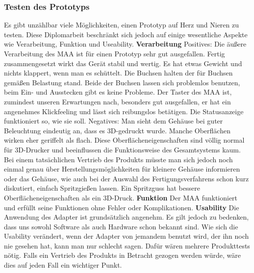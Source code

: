 \documentclass[11pt, twoside]{article}
\begin{document}
\subsubsection{Testen des Prototyps}
Es gibt unzählbar viele Möglichkeiten, einen Prototyp auf Herz und Nieren zu testen. Diese Diplomarbeit beschränkt sich jedoch auf einige wesentliche Aspekte wie Verarbeitung, Funktion und Useability.
\vspace{4mm}\newline
\textbf{Verarbeitung}
\vspace{4mm}\newline
Positives:\newline
Die äußere Verarbeitung des MAA ist für einen Prototyp sehr gut ausgefallen. Fertig zusammengesetzt wirkt das Gerät stabil und wertig. Es hat etwas Gewicht und nichts klappert, wenn man es schüttelt. Die Buchsen halten der für Buchsen gemäßen Belastung stand. Beide der Buchsen lassen sich problemlos benutzen, beim Ein- und Ausstecken gibt es keine Probleme. Der Taster des MAA ist, zumindest unseren Erwartungen nach, besonders gut ausgefallen, er hat ein angenehmes Klickfeeling und lässt sich reibungslos betätigen. Die Statusanzeige funktioniert so, wie sie soll.
\vspace{4mm}\newline
Negatives:\newline
Man sieht dem Gehäuse bei guter Beleuchtung eindeutig an, dass es 3D-gedruckt wurde. Manche Oberflächen wirken eher geriffelt als flach. Diese Oberflächeneigenschaften sind völlig normal für 3D-Drucker und beeinflussen die Funktionsweise des Gesamtsystems kaum. Bei einem tatsächlichen Vertrieb des Produkts müsste man sich jedoch noch einmal genau über Herstellungsmöglichkeiten für kleinere Gehäuse informieren oder das Gehäuse, wie auch bei der Auswahl des Fertigungsverfahrens schon kurz diskutiert, einfach Spritzgießen lassen. Ein Spritzguss hat bessere Oberflächeneigenschaften als ein 3D-Druck.
\vspace{4mm}\newline
\parencite[vgl.][]{redaktion_urlnl18_2020}
\vspace{4mm}\newline
\textbf{Funktion}\newline
Der MAA funktioniert und erfüllt seine Funktionen ohne Fehler oder Komplikationen.
\vspace{4mm}\newline
\textbf{Usability}\newline
Die Anwendung des Adapter ist grundsätzlich angenehm. Es gilt jedoch zu bedenken, dass uns sowohl Software als auch Hardware schon bekannt sind. Wie sich die Usability verändert, wenn der Adapter von jemandem benutzt wird, der ihn noch nie gesehen hat, kann man nur schlecht sagen. Dafür wären mehrere Produkttests nötig. Falls ein Vertrieb des Produkts in Betracht gezogen werden würde, wäre dies auf jeden Fall ein wichtiger Punkt.\newline
\end{document}
